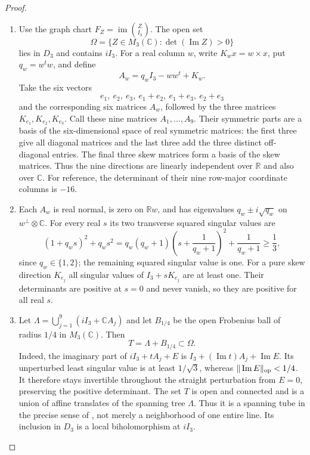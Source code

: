\documentclass[11pt,a4paper]{article}
\theoremstyle{definition}
\begin{document}
\begin{proof}
\begin{enumerate}[label=\arabic*.]
\item Use the graph chart $F_Z=\operatorname{im}\binom Z{I_3}$.
The open set
\[
 \Omega=\{Z\in M_3(\mathbb C):\det(\operatorname{Im}Z)>0\}
 \tag{F.O1}\label{maps:eq:F.O1}
\]
lies in $D_3$ and contains $iI_3$.  For a real column $w$, write
$K_w x=w\times x$, put $q_w=w^tw$, and define
\[
 A_w=q_wI_3-ww^t+K_w.
 \tag{F.O2}\label{maps:eq:F.O2}
\]
Take the six vectors
\[
 e_1,\ e_2,\ e_3,\ e_1+e_2,\ e_1+e_3,\ e_2+e_3
\]
and the corresponding six matrices $A_w$, followed by the three
matrices $K_{e_1},K_{e_2},K_{e_3}$.  Call these nine matrices
$A_1,\ldots,A_9$.  Their symmetric parts are a basis of the
six-dimensional space of real symmetric matrices: the first three
give all diagonal matrices and the last three add the three distinct
off-diagonal entries.  The final three skew matrices form a basis
of the skew matrices.  Thus the nine directions are linearly
independent over $\mathbb R$ and also over $\mathbb C$.
For reference, the determinant of their nine row-major coordinate
columns is $-16$.

\item Each $A_w$ is real normal, is zero on $\mathbb Rw$, and has
eigenvalues $q_w\pm i\sqrt{q_w}$ on $w^\perp\otimes\mathbb C$.
For every real $s$ its two transverse squared singular values are
\[
 (1+q_ws)^2+q_ws^2
 =q_w(q_w+1)\left(s+\frac1{q_w+1}\right)^2
       +\frac1{q_w+1}\ge\frac13,
 \tag{F.O3}\label{maps:eq:F.O3}
\]
since $q_w\in\{1,2\}$; the remaining squared singular value is one.
For a pure skew direction $K_{e_j}$ all singular values of
$I_3+sK_{e_j}$ are at least one.  Their determinants are positive
at $s=0$ and never vanish, so they are positive for all real $s$.

\item Let $\Lambda=\bigcup_{j=1}^9(iI_3+\mathbb C A_j)$ and let
$B_{1/4}$ be the open Frobenius ball of radius $1/4$ in
$M_3(\mathbb C)$.  Then
\[
 T=\Lambda+B_{1/4}\subset\Omega.
 \tag{F.O4}\label{maps:eq:F.O4}
\]
Indeed, the imaginary part of $iI_3+tA_j+E$ is
$I_3+(\operatorname{Im}t)A_j+\operatorname{Im}E$.
Its unperturbed least singular value is at least $1/\sqrt3$,
whereas $\|\operatorname{Im}E\|_{\rm op}<1/4$.
It therefore stays invertible throughout the straight perturbation
from $E=0$, preserving the positive determinant.
The set $T$ is open and connected and is a union of affine
translates of the spanning tree $\Lambda$.  Thus it is a spanning
tube in the precise sense of \cite[Definition 2.1, p.~4]{IVVOkaOneV5},
not merely a neighborhood of one entire line.  Its inclusion in
$D_3$ is a local biholomorphism at $iI_3$.


\end{enumerate}
\end{proof}
\end{document}
